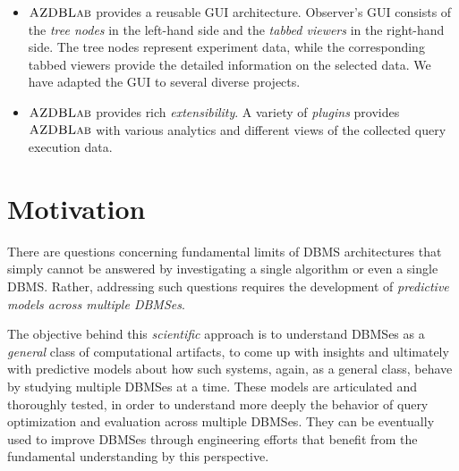 \documentclass{vldb}
\def\azdb{\hbox{\sc AZDBLab}}
\begin{document}
\begin{itemize}
\item $\azdb$ provides a reusable GUI architecture. \linebreak \hbox{Observer}'s GUI consists of the {\em tree nodes} in the left-hand side and the {\em tabbed viewers} in the right-hand side. The tree nodes represent \hbox{experiment} data, while the corresponding tabbed viewers provide the detailed \hbox{information} on the selected data. 
We have adapted the \hbox{GUI} to several diverse projects.

\item $\azdb$ provides rich {\em extensibility}. A variety of \hbox{{\em plugins}} provides $\azdb$ 
with various analytics and \hbox{different} views of the collected query execution data.





\end{itemize}

\section{Motivation}\label{sec:motivation} 

There are questions concerning fundamental limits of \linebreak \hbox{DBMS} 
architectures that simply cannot be answered by \hbox{investigating} a single \hbox{algorithm} or even a single DBMS. 
Rather, \hbox{addressing} such questions requires the development of {\em \hbox{predictive} models across multiple \hbox{DBMSes}}. 

The objective behind this {\em scientific} approach is to \linebreak \hbox{understand} \hbox{DBMSes} 
as a {\em general} class of computational \hbox{artifacts}, 
to come up with insights and ultimately with \linebreak \hbox{predictive} models 
about how such systems, again, as a \linebreak \hbox{general} class, behave by studying multiple \hbox{DBMSes} at a time. 
These models are articulated and thoroughly tested, in order to \hbox{understand} more deeply the behavior of query \hbox{optimization} and \hbox{evaluation} across multiple \hbox{DBMSes}. 
They can be \hbox{eventually} used to improve \hbox{DBMSes} through \linebreak \hbox{engineering} efforts 
that benefit from the fundamental \linebreak \hbox{understanding} by this \hbox{perspective}. 
\end{document}
